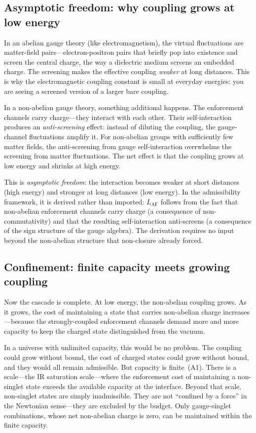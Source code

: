 \documentclass[11pt]{article}
\begin{document}
\subsection{Asymptotic freedom: why coupling grows at low energy}

In an abelian gauge theory (like electromagnetism), the virtual fluctuations are matter-field pairs---electron-positron pairs that briefly pop into existence and screen the central charge, the way a dielectric medium screens an embedded charge.  The screening makes the effective coupling \emph{weaker} at long distances.  This is why the electromagnetic coupling constant is small at everyday energies: you are seeing a screened version of a larger bare coupling.

In a non-abelian gauge theory, something additional happens.  The enforcement channels carry charge---they interact with each other.  Their self-interaction produces an \emph{anti-screening} effect: instead of diluting the coupling, the gauge-channel fluctuations amplify it.  For non-abelian groups with sufficiently few matter fields, the anti-screening from gauge self-interaction overwhelms the screening from matter fluctuations.  The net effect is that the coupling grows at low energy and shrinks at high energy.

This is \emph{asymptotic freedom}: the interaction becomes weaker at short distances (high energy) and stronger at long distances (low energy).  In the admissibility framework, it is derived rather than imported: $L_{\mathrm{AF}}$ follows from the fact that non-abelian enforcement channels carry charge (a consequence of non-commutativity) and that the resulting self-interaction anti-screens (a consequence of the sign structure of the gauge algebra).  The derivation requires no input beyond the non-abelian structure that non-closure already forced.

\subsection{Confinement: finite capacity meets growing coupling}

Now the cascade is complete.  At low energy, the non-abelian coupling grows.  As it grows, the cost of maintaining a state that carries non-abelian charge increases---because the strongly-coupled enforcement channels demand more and more capacity to keep the charged state distinguished from the vacuum.

In a universe with unlimited capacity, this would be no problem.  The coupling could grow without bound, the cost of charged states could grow without bound, and they would all remain admissible.  But capacity is finite~(A1).  There is a scale---the IR saturation scale---where the enforcement cost of maintaining a non-singlet state exceeds the available capacity at the interface.  Beyond that scale, non-singlet states are simply inadmissible.  They are not ``confined by a force'' in the Newtonian sense---they are excluded by the budget.  Only gauge-singlet combinations, whose net non-abelian charge is zero, can be maintained within the finite capacity.
\end{document}
